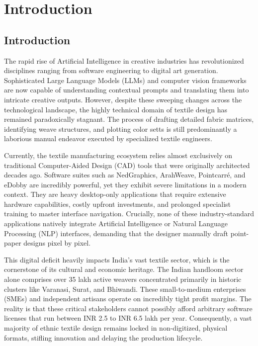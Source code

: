 \chapter{Introduction}

\section{Introduction}
The rapid rise of Artificial Intelligence in creative industries has revolutionized disciplines ranging from software engineering to digital art generation. Sophisticated Large Language Models (LLMs) and computer vision frameworks are now capable of understanding contextual prompts and translating them into intricate creative outputs. However, despite these sweeping changes across the technological landscape, the highly technical domain of textile design has remained paradoxically stagnant. The process of drafting detailed fabric matrices, identifying weave structures, and plotting color setts is still predominantly a laborious manual endeavor executed by specialized textile engineers.

Currently, the textile manufacturing ecosystem relies almost exclusively on traditional Computer-Aided Design (CAD) tools that were originally architected decades ago. Software suites such as NedGraphics, ArahWeave, Pointcarré, and eDobby are incredibly powerful, yet they exhibit severe limitations in a modern context. They are heavy desktop-only applications that require extensive hardware capabilities, costly upfront investments, and prolonged specialist training to master interface navigation. Crucially, none of these industry-standard applications natively integrate Artificial Intelligence or Natural Language Processing (NLP) interfaces, demanding that the designer manually draft point-paper designs pixel by pixel.

This digital deficit heavily impacts India's vast textile sector, which is the cornerstone of its cultural and economic heritage. The Indian handloom sector alone comprises over 35 lakh active weavers concentrated primarily in historic clusters like Varanasi, Surat, and Bhiwandi. These small-to-medium enterprises (SMEs) and independent artisans operate on incredibly tight profit margins. The reality is that these critical stakeholders cannot possibly afford arbitrary software licenses that run between INR 2.5 to INR 6.5 lakh per year. Consequently, a vast majority of ethnic textile design remains locked in non-digitized, physical formats, stifling innovation and delaying the production lifecycle.

